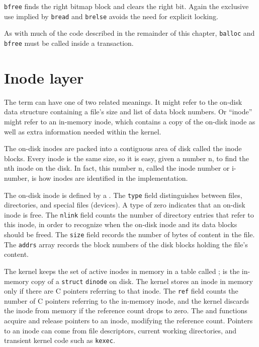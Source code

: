 \lstinline{bfree}
finds the right bitmap block and clears the right bit.
Again the exclusive use implied by
\lstinline{bread}
and
\lstinline{brelse}
avoids the need for explicit locking.

As with much of the code described in the remainder of this chapter, 
\lstinline{balloc}
and
\lstinline{bfree}
must be called inside a transaction.
\section{Inode layer}

The term 
can have one of two related meanings.
It might refer to the on-disk data structure containing
a file's size and list of data block numbers.
Or ``inode'' might refer to an in-memory inode, which contains
a copy of the on-disk inode as well as extra information needed
within the kernel.

The on-disk inodes
are packed into a contiguous area
of disk called the inode blocks.
Every inode is the same size, so it is easy, given a
number n, to find the nth inode on the disk.
In fact, this number n, called the inode number or i-number,
is how inodes are identified in the implementation.

The on-disk inode is defined by a
.
The 
\lstinline{type}
field distinguishes between files, directories, and special
files (devices).
A type of zero indicates that an on-disk inode is free.
The
\lstinline{nlink}
field counts the number of directory entries that
refer to this inode, in order to recognize when the
on-disk inode and its data blocks should be freed.
The
\lstinline{size}
field records the number of bytes of content in the file.
The
\lstinline{addrs}
array records the block numbers of the disk blocks holding
the file's content.

The kernel keeps the set of active inodes in memory
in a table called ;
is the in-memory copy of a 
\lstinline{struct}
\lstinline{dinode}
on disk.
The kernel stores an inode in memory only if there are
C pointers referring to that inode. The
\lstinline{ref}
field counts the number of C pointers referring to the
in-memory inode, and the kernel discards the inode from
memory if the reference count drops to zero.
The
and
functions acquire and release pointers to an inode,
modifying the reference count.
Pointers to an inode can come from file descriptors,
current working directories, and transient kernel code
such as
\lstinline{kexec}.

